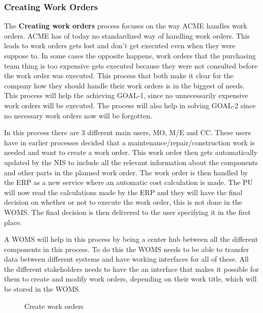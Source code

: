 \subsubsection{Creating Work Orders}
\label{sec:bp2}
The \textbf{Creating work orders} process focuses on the way ACME handles work orders. ACME has of today no standardized way of handling work orders. This leads to work orders gets lost and don't get executed even when they were suppose to. In some cases the opposite happens, work orders that the purchasing team thing is too expensive gets executed because they were not consulted before the work order was executed. This process that both make it clear for the company how they should handle their work orders is in the biggest of needs. This process will help the achieving GOAL-1, since no unnecessarily expensive work orders will be executed. The process will also help in solving GOAL-2 since no necessary work orders now will be forgotten. 

In this process there are 3 different main users, MO, M/E and CC. These users have in earlier processes decided that a maintenance/repair/construction work is needed and want to create a work order. This work order then gets automatically updated by the NIS to include all the relevant information about the components and other parts in the planned work order. The work order is then handled by the ERP as a new service where an automatic cost calculation is made. The PU will now read the calculations made by the ERP and they will have the final decision on whether or not to execute the work order, this is not done in the WOMS. The final decision is then delivered to the user specifying it in the first place.

A WOMS will help in this process by being a center hub between all the different components in this process. To do this the WOMS needs to be able to transfer data between different systems and have working interfaces for all of these. All the different stakeholders needs to have the an interface that makes it possible for them to create and modify work orders, depending on their work title, which will be stored in the WOMS.
\begin{figure}[H]
	\centering
	\setlength\fboxsep{7pt}
	\setlength\fboxrule{0.5pt}
	\label{fig:create}
	\caption{Create work orders}
\end{figure}
%
